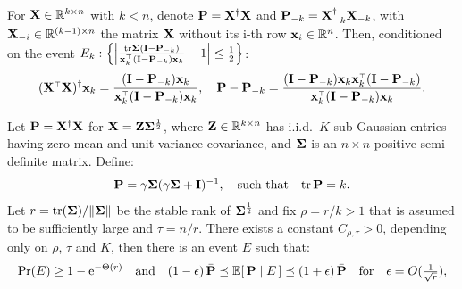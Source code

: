 \documentclass[11pt]{article}
\begin{document}
\begin{lemma}\label{lem:rank-one-update}
    For $\mathbf X \in \mathbb R^{k \times n}$ with $k<n$, denote $\mathbf P = \mathbf X^\dagger \mathbf X$ and $\mathbf P_{-k} = \mathbf X_{-k}^\dagger \mathbf X_{-k}$, with $\mathbf X_{-i} \in \mathbb R^{(k-1) \times n}$ the matrix $\mathbf X$ without its i-th row $\mathbf x_i \in \mathbb R^n$. Then, conditioned on the event $E_k: \left\{ \left| \frac{\tr \Sigmab (\I - \P_{-k})}{\x_k^\top (\I - \P_{-k}) \x_k} - 1 \right| \le \frac12 \right\}$:
    \begin{align*}
      (\X^\top\X)^\dagger\x_k = \frac{(\I - \P_{-k}) \x_k}{\x_k^\top (\I - \P_{-k}) \x_k}, \quad \P - \P_{-k} = \frac{(\I - \P_{-k}) \x_k \x_k^\top (\I - \P_{-k}) }{\x_k^\top (\I - \P_{-k}) \x_k}.
    \end{align*}
\end{lemma}

\clearpage

\begin{theorem}%
Let $\mathbf P = \mathbf X^\dagger \mathbf X$ for $\mathbf X = \mathbf Z\mathbf{\Sigma}^{\frac12}$,
where $\mathbf Z \in \mathbb R^{k\times n}$ has i.i.d.~$K$-sub-Gaussian entries having zero mean and unit variance covariance, and $\mathbf{\Sigma}$ is an $n\times n$ positive semi-definite matrix. Define: 
\begin{align*}
\bar{\mathbf P} = \gamma \mathbf{\Sigma} (\gamma\mathbf{\Sigma} + \mathbf I)^{-1},\quad\text{such that}\quad\mathrm{tr}\,\bar{\mathbf P} = k.
\end{align*}
Let $r =\mathrm{tr}(\mathbf{\Sigma})/\|\mathbf{\Sigma}\|$
be the stable rank of
$\mathbf{\Sigma}^{\frac12}$ and fix $\rho=r/k > 1$ that is assumed to be sufficiently large and $\tau = n/r$. There exists a constant
$C_{\rho,\tau}>0$, depending only on $\rho$, $\tau$ and $K$, then there is an event $E$ such that:
\begin{align*}
  \mathrm{Pr}(E)\geq 1-\mathrm{e}^{-\Theta(r)}\quad\text{and}\quad
  (1-\epsilon)\,\bar{\mathbf P}\preceq\mathbb E[\,\mathbf P\mid E\,]
  \preceq(1+\epsilon)\,\bar{\mathbf P}\quad\text{for}\quad
  \epsilon=O(\tfrac1{\sqrt r}),
\end{align*}
\end{theorem}
\end{document}
